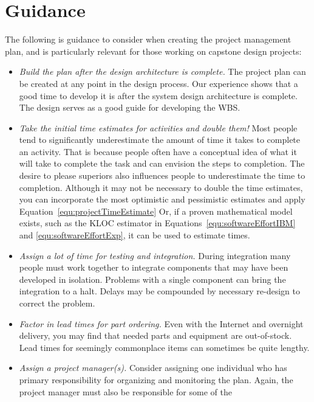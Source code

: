 \section{Guidance}
\label{section:projectManagementGuidance}

The following is guidance to consider when creating the project
management plan, and is particularly relevant for those working on
capstone design projects:

\begin{itemize}
\item
  \emph{Build the plan after the design architecture is complete.} The
  project plan can be created at any point in the design process. Our
  experience shows that a good time to develop it is after the system
  design architecture is complete. The design serves as a good guide for
  developing the WBS.
\item
  \emph{Take the initial time estimates for activities and double them!}
  Most people tend to significantly underestimate the amount of time it
  takes to complete an activity. That is because people often have a
  conceptual idea of what it will take to complete the task and can
  envision the steps to completion. The desire to please superiors also
  influences people to underestimate the time to completion. Although it
  may not be necessary to double the time estimates, you can incorporate
  the most optimistic and pessimistic estimates and apply 
Equation~\ref{equ:projectTimeEstimate}
  Or, if a proven mathematical model exists, such as the KLOC estimator
  in Equations~\ref{equ:softwareEffortIBM} and \ref{equ:softwareEffortExp}, 
it can be used to estimate times.
\item
  \emph{Assign a lot of time for testing and integration.} During
  integration many people must work together to integrate components
  that may have been developed in isolation. Problems with a single
  component can bring the integration to a halt. Delays may be
  compounded by necessary re-design to correct the problem.
\item
  \emph{Factor in lead times for part ordering.} Even with the Internet
  and overnight delivery, you may find that needed parts and equipment
  are out-of-stock. Lead times for seemingly commonplace items can
  sometimes be quite lengthy.
\item
  \emph{Assign a project manager(s).} Consider assigning one individual
  who has primary responsibility for organizing and monitoring the plan.
  Again, the project manager must also be responsible for some of the

\end{itemize}
